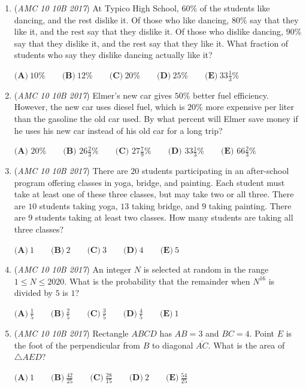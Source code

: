 \begin{enumerate}
	\item (\textit{AMC 10 10B 2017}) At Typico High School, $60\%$ of the students like dancing, and the rest dislike it. Of those who like dancing, $80\%$ say that they like it, and the rest say that they dislike it. Of those who dislike dancing, $90\%$ say that they dislike it, and the rest say that they like it. What fraction of students who say they dislike dancing actually like it?


 $\textbf{(A)}\ 10\%\qquad\textbf{(B)}\ 12\%\qquad\textbf{(C)}\ 20\%\qquad\textbf{(D)}\ 25\%\qquad\textbf{(E)}\ 33\frac{1}{3}\%$


	\item (\textit{AMC 10 10B 2017}) Elmer's new car gives $50\%$ better fuel efficiency. However, the new car uses diesel fuel, which is $20\%$ more expensive per liter than the gasoline the old car used. By what percent will Elmer save money if he uses his new car instead of his old car for a long trip?


 $\textbf{(A) } 20\% \qquad \textbf{(B) } 26\frac23\% \qquad \textbf{(C) } 27\frac79\% \qquad \textbf{(D) } 33\frac13\% \qquad \textbf{(E) } 66\frac23\%$


	\item (\textit{AMC 10 10B 2017}) There are $20$ students participating in an after-school program offering classes in yoga, bridge, and painting. Each student must take at least one of these three classes, but may take two or all three. There are $10$ students taking yoga, $13$ taking bridge, and $9$ taking painting. There are $9$ students taking at least two classes. How many students are taking all three classes?


 $\textbf{(A)}\ 1\qquad\textbf{(B)}\ 2\qquad\textbf{(C)}\ 3\qquad\textbf{(D)}\ 4\qquad\textbf{(E)}\ 5$


	\item (\textit{AMC 10 10B 2017}) An integer $N$ is selected at random in the range $1\leq N \leq 2020$. What is the probability that the remainder when $N^{16}$ is divided by $5$ is $1$?


 $\textbf{(A)}\ \frac{1}{5}\qquad\textbf{(B)}\ \frac{2}{5}\qquad\textbf{(C)}\ \frac{3}{5}\qquad\textbf{(D)}\ \frac{4}{5}\qquad\textbf{(E)}\ 1$


	\item (\textit{AMC 10 10B 2017}) Rectangle $ABCD$ has $AB=3$ and $BC=4$. Point $E$ is the foot of the perpendicular from $B$ to diagonal $\overline{AC}$. What is the area of $\triangle AED$?


 $\textbf{(A)}\ 1\qquad\textbf{(B)}\ \frac{42}{25}\qquad\textbf{(C)}\ \frac{28}{15}\qquad\textbf{(D)}\ 2\qquad\textbf{(E)}\ \frac{54}{25}$



\end{enumerate}
